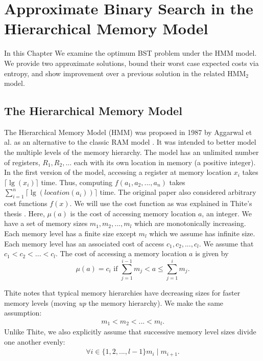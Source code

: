 \documentclass[letterpaper,12pt,titlepage,oneside,final]{book}
\theoremstyle{plain}
\begin{document}
\chapter{Approximate Binary Search in the Hierarchical Memory Model}\label{Approximate Binary Search in the Hierarchical Memory Model}
 
In this Chapter We examine the optimum BST problem under the HMM model. We provide two approximate solutions, bound their worst case expected costs via entropy, and show improvement over a previous solution in the related HMM$_2$ model. 
 
\section{The Hierarchical Memory Model}\label{The Hierarchical Memory Model}

The Hierarchical Memory Model (HMM) was proposed in 1987 by Aggarwal et al. as an alternative to the classic RAM model \cite{aggarwal1987model}. It was intended to better model the multiple levels of the memory hierarchy. The model has an unlimited number of registers, $R_1, R_2, ...$ each with its own location in memory (a positive integer). In the first version of the model, accessing a register at memory location $x_i$ takes $\lceil \lg(x_i) \rceil$ time. Thus, computing $f(a_1, a_2, ..., a_n)$ takes $\sum_{i=1}^{n} \lceil \lg(location(a_i)) \rceil$ time. The original paper also considered arbitrary cost functions $f(x)$. We will use the cost function as was explained in Thite's thesis \cite{thite2008optimum}. Here, $\mu (a)$ is the cost of accessing memory location $a$, an integer. We have a set of memory sizes $m_1, m_2, ..., m_l$ which are monotonically increasing. Each memory level has a finite size except $m_l$ which we assume has infinite size. Each memory level has an associated cost of access $c_1, c_2, ..., c_l$. We assume that $c_1 < c_2 < ... < c_l$. The cost of accessing a memory location $a$ is given by
\begin{equation}
\mu (a) = c_i \text{ if } \sum_{j = 1}^{i-1}m_j  < a \leq \sum_{j = 1}^{i}m_j.
\end{equation}


\noindent Thite notes that typical memory hierarchies have decreasing sizes for faster memory levels (moving \textit{up} the memory hierarchy). We make the same assumption:
\begin{align*}
m_1 < m_2 < ... < m_l.
\end{align*}
Unlike Thite, we also explicitly assume that successive memory level sizes divide one another evenly:
\begin{align*}
\forall i \in  \{1,2,...,l-1\} m_i \mid m_{i+1}.
\end{align*}
\end{document}

